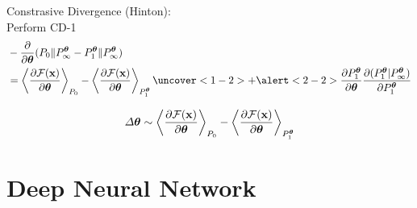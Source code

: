 	\begin{frame}[t]{Constrasive Divergence}
	 (Hinton):\\
	 Perform CD-1
	    \begin{align}
	    &-\dfrac{\partial}{\partial \btheta} (P_0\|P_{\infty}^{\btheta} - P_{1}^{\btheta}\|P_{\infty}^{\btheta})\nonumber\\\vspace{3mm}
	    &=\left\langle \frac{\partial \mathcal{F}(\x)}{\partial \boldsymbol{\theta}}\right\rangle_{P_0} 
		  -\left\langle \frac{\partial \mathcal{F}(\x)}{\partial \boldsymbol{\theta}}\right\rangle_{P_{1}^{\btheta}}\nonumber
		  \uncover<1-2>{ +\alert<2-2>{\frac{\partial P_{1}^{\btheta}}{\partial \btheta} \frac{\partial (P_{1}^{\btheta}|P_{\infty}^{\btheta})}{\partial P_{1}^{\btheta}}\nonumber}}
	    \end{align}
	    
	 {
	 \begin{align}
	  \Delta \boldsymbol{\theta} \sim \left\langle \frac{\partial \mathcal{F}(\mathbf{x})}{\partial \boldsymbol{\theta}}\right\rangle_{P_0} 
		  -\left\langle \frac{\partial \mathcal{F}(\mathbf{x})}{\partial \boldsymbol{\theta}}\right\rangle_{P_{1}^{\boldsymbol{\theta}}}\nonumber
	 \end{align}
	}
	\end{frame}
% 
% 
% 
% 
% 
%   

\section{Deep Neural Network}%

